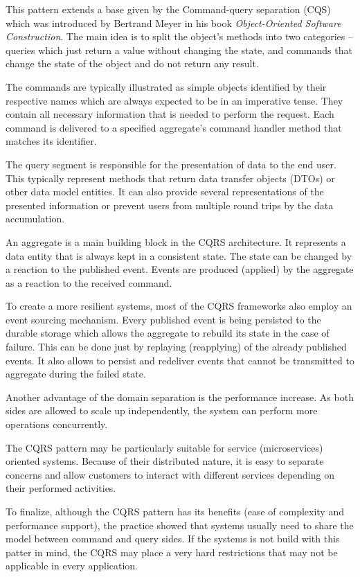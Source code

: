 \documentclass[oneside,
  digital, %
  table,   %
  nolof,     %
  nolot,     %
]{fithesis3}
\begin{document}
This pattern extends a base given by the Command-query separation (CQS) which was introduced by Bertrand Meyer in his book \textit{Object-Oriented Software Construction}. The main idea is to split the object's methods into two categories -- queries which just return a value without changing the state, and commands that change the state of the object and do not return any result.

The commands are typically illustrated as simple objects identified by their respective names which are always expected to be in an imperative tense. They contain all necessary information that is needed to perform the request. Each command is delivered to a specified aggregate's command handler method that matches its identifier. 

The query segment is responsible for the presentation of data to the end user. This typically represent methods that return data transfer objects (DTOs) or other data model entities. It can also provide several representations of the presented information or prevent users from multiple round trips by the data accumulation.

An aggregate is a main building block in the CQRS architecture. It represents a data entity that is always kept in a consistent state. The state can be changed by a reaction to the published event. Events are produced (applied) by the aggregate as a reaction to the received command. 

To create a more resilient systems, most of the CQRS frameworks also employ an event sourcing mechanism. Every published event is being persisted to the durable storage which allows the aggregate to rebuild its state in the case of failure. This can be done just by replaying (reapplying) of the already published events. It also allows to persist and redeliver events that cannot be transmitted to aggregate during the failed state.

Another advantage of the domain separation is the performance increase. As both sides are allowed to scale up independently, the system can perform more operations concurrently.

The CQRS pattern may be particularly suitable for service (microservices) oriented systems. Because of their distributed nature, it is easy to separate concerns and allow customers to interact with different services depending on their performed activities.

To finalize, although the CQRS pattern has its benefits (ease of complexity and performance support), the practice showed that systems usually need to share the model between command and query sides. If the systems is not build with this patter in mind, the CQRS may place a very hard restrictions that may not be applicable in every application.
\end{document}
